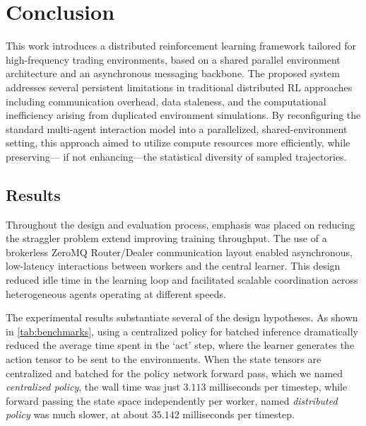 \chapter{Conclusion}
\label{ch:conclusion}

This work introduces a distributed reinforcement learning framework tailored for high-frequency trading environments,
based on a shared parallel environment architecture and an asynchronous messaging backbone.
The proposed system addresses several persistent limitations in traditional distributed RL approaches
including communication overhead, data staleness, and the computational inefficiency arising from duplicated environment simulations.
By reconfiguring the standard multi-agent interaction model into a parallelized,
shared-environment setting, this approach aimed to utilize compute resources more efficiently, while preserving---
if not enhancing---the statistical diversity of sampled trajectories.


\section{Results}
\label{sec:results}

Throughout the design and evaluation process, emphasis was placed on reducing the straggler problem extend improving training throughput.
The use of a brokerless ZeroMQ Router/Dealer communication layout enabled asynchronous, low-latency interactions between workers and the central learner.
This design reduced idle time in the learning loop and facilitated scalable coordination across heterogeneous agents operating at different speeds.

The experimental results substantiate several of the design hypotheses.
As shown in \cref{tab:benchmarks}, using a centralized policy for batched inference dramatically reduced the average time spent in the `act' step,
where the learner generates the action tensor to be sent to the environments.
When the state tensors are centralized and batched for the policy network forward pass, which we named \textit{centralized policy},
the wall time was just $3.113$ milliseconds per timestep, while forward passing the state space independently per worker, named \textit{distributed policy}
was much slower, at about $35.142$ milliseconds per timestep.

